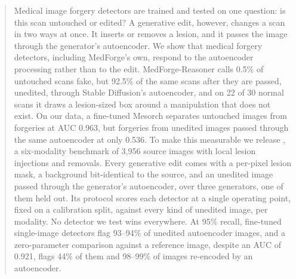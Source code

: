 \begin{abstract}
Medical image forgery detectors are trained and tested on one question: is this scan untouched or edited?
A generative edit, however, changes a scan in two ways at once.
It inserts or removes a lesion, and it passes the image through the generator's autoencoder.
We show that medical forgery detectors, including MedForge's own, respond to the autoencoder processing rather than to the edit.
MedForge-Reasoner calls 0.5\% of untouched scans fake, %
but 92.5\% of the same scans after they are passed, unedited, through Stable Diffusion's autoencoder, %
and on 22 of 30 normal scans it draws a lesion-sized box around a manipulation that does not exist. %
On our data, a fine-tuned Mesorch separates untouched images from forgeries at AUC 0.963, %
but forgeries from unedited images passed through the same autoencoder at only 0.536. %
To make this measurable we release \dataset, a six-modality benchmark of 3,956 source images with local lesion injections and removals. %
Every generative edit comes with a per-pixel lesion mask, a background bit-identical to the source, and an unedited image passed through the generator's autoencoder, over three generators, one of them held out.
Its protocol scores each detector at a single operating point, fixed on a calibration split, against every kind of unedited image, per modality.
No detector we test wins everywhere.
At 95\% recall, fine-tuned single-image detectors flag 93--94\% of unedited autoencoder images, %
and a zero-parameter comparison against a reference image, despite an AUC of 0.921, flags 44\% of them and 98--99\% of images re-encoded by an autoencoder. %
\end{abstract}
